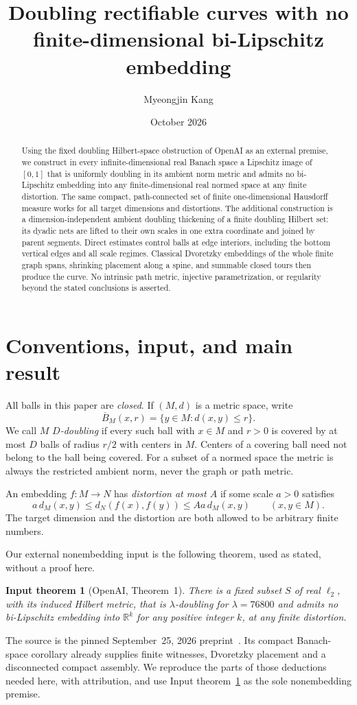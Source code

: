 \documentclass[11pt,a4paper]{article}
\title{Doubling rectifiable curves with no finite-dimensional bi-Lipschitz embedding}
\author{Myeongjin Kang}
\date{October 2026}
\newtheorem{premise}{Input theorem}
\theoremstyle{definition}
\theoremstyle{remark}
\numberwithin{equation}{section}
\newcommand{\R}{\mathbb R}
\newcommand{\cB}{\overline B}
\begin{document}
\maketitle
\begin{abstract}
Using the fixed doubling Hilbert-space obstruction of OpenAI as an external premise, we construct in every infinite-dimensional real Banach space a Lipschitz image of $[0,1]$ that is uniformly doubling in its ambient norm metric and admits no bi-Lipschitz embedding into any finite-dimensional real normed space at any finite distortion. The same compact, path-connected set of finite one-dimensional Hausdorff measure works for all target dimensions and distortions. The additional construction is a dimension-independent ambient doubling thickening of a finite doubling Hilbert set: its dyadic nets are lifted to their own scales in one extra coordinate and joined by parent segments. Direct estimates control balls at edge interiors, including the bottom vertical edges and all scale regimes. Classical Dvoretzky embeddings of the whole finite graph spans, shrinking placement along a spine, and summable closed tours then produce the curve. No intrinsic path metric, injective parametrization, or regularity beyond the stated conclusions is asserted.
\end{abstract}

\section{Conventions, input, and main result}
All balls in this paper are \emph{closed}. If $(M,d)$ is a metric space, write
\[
 \cB_M(x,r)=\{y\in M:d(x,y)\le r\}.
\]
We call $M$ \emph{$D$-doubling} if every such ball with $x\in M$ and $r>0$ is covered by at most $D$ balls of radius $r/2$ with centers in $M$. Centers of a covering ball need not belong to the ball being covered. For a subset of a normed space the metric is always the restricted ambient norm, never the graph or path metric.

An embedding $f:M\to N$ has \emph{distortion at most $A$} if some scale $a>0$ satisfies
\begin{equation}\label{eq:distortion}
 a\,d_M(x,y)\le d_N(f(x),f(y))\le Aa\,d_M(x,y)
 \qquad(x,y\in M).
\end{equation}
The target dimension and the distortion are both allowed to be arbitrary finite numbers.

Our external nonembedding input is the following theorem, used as stated, without a proof here.
\begin{premise}[OpenAI, Theorem~1]\label{input:source}
There is a fixed subset $S$ of real $\ell_2$, with its induced Hilbert metric, that is $\lambda$-doubling for $\lambda=76800$ and admits no bi-Lipschitz embedding into $\R^k$ for any positive integer $k$, at any finite distortion.
\end{premise}
The source is the pinned September~25, 2026 preprint~\cite{OpenAI}. Its compact Banach-space corollary already supplies finite witnesses, Dvoretzky placement and a disconnected compact assembly. We reproduce the parts of those deductions needed here, with attribution, and use Input theorem~\ref{input:source} as the sole nonembedding premise.
\end{document}
